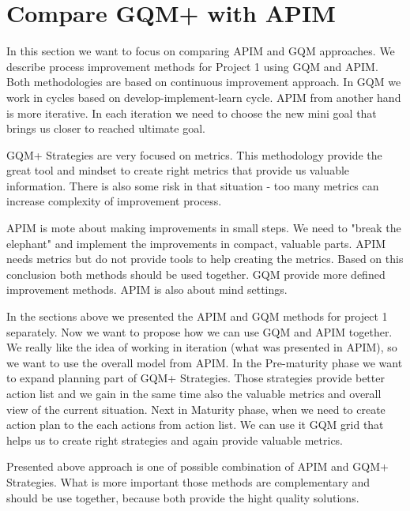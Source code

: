 \section{Compare GQM+ with APIM}

In this section we want to focus on comparing APIM and GQM approaches. We describe process improvement methods for Project 1 using GQM and APIM. Both methodologies are based on continuous improvement approach. In GQM we work in cycles based on develop-implement-learn cycle. APIM from another hand is more iterative. In each iteration we need to choose the new mini goal that brings us closer to reached ultimate goal.

GQM+ Strategies are very focused on metrics. This methodology provide the great tool and mindset to create right metrics that provide us valuable information. There is also some risk in that situation - too many metrics can increase complexity of improvement process. 

APIM is mote about making improvements in small steps. We need to "break the elephant" and implement the improvements in compact, valuable parts. APIM needs metrics but do not provide tools to help creating the metrics. Based on this conclusion both methods should be used together. GQM provide more defined improvement methods. APIM is also about mind settings.

In the sections above we presented the APIM and GQM methods for project 1 separately. Now we want to propose how we can use GQM and APIM together. We really like the idea of working in iteration (what was presented in APIM), so we want to use the overall model from APIM. In the Pre-maturity phase we want to expand planning part of GQM+ Strategies. Those strategies provide better action list and we gain in the same time also the valuable metrics and overall view of the current situation. Next in Maturity phase, when we need to create action plan to the each actions from action list. We can use it GQM grid that helps us to create right strategies and again provide valuable metrics. 

Presented above approach is one of possible combination of APIM and GQM+ Strategies. What is more important those methods are complementary and should be use together, because both provide the hight quality solutions.